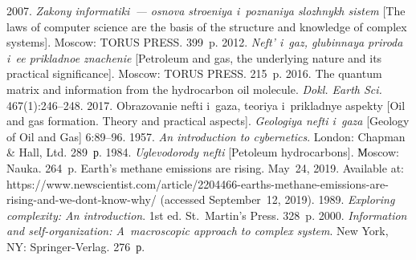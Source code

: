 


  



  \begin{multicols}{2}

\renewcommand{\bibname}{\protect\rmfamily References}

{\small\frenchspacing
 {%
 \begin{thebibliography}{99}
 2007. \textit{Zakony informatiki~--- osnova stroeniya i~poznaniya slozhnykh 
sistem} [The laws of computer science are the basis of the structure and knowledge of complex 
systems]. Moscow: TORUS PRESS. 399~p.
 2012. \textit{Neft' i~gaz, glubinnaya priroda i~ee 
prikladnoe 
znachenie} [Petroleum and gas, the underlying nature and its practical significance]. Moscow: 
TORUS PRESS. 215~p.
 2016. The 
quantum matrix and information from the hydrocarbon oil molecule. 
\textit{Dokl. Earth Sci.}  467(1):246--248.
 2017. Obrazovanie nefti i~gaza, teoriya i~prikladnye aspekty 
[Oil and gas formation. Theory and practical aspects]. \textit{Geologiya nefti i~gaza} [Geology 
of Oil and Gas] 6:89--96.
 1957. \textit{An introduction to cybernetics}. London: Chapman \& Hall, Ltd.  
289~р.
 1984. \textit{Uglevodorody nefti} [Petoleum hydrocarbons]. Мoscow: Nauka. 
264~p.
Earth's methane emissions are rising. May~24, 2019. Available at: {\sf 
 https://www.newscientist.com/article/2204466-earths-methane-emissions-are-rising-and-we-dont-know-why/} (accessed September~12, 2019).
 1989. \textit{Exploring 
complexity: An introduction}. 1st ed. St.\ Martin's Press. 328~p.
 2000. \textit{Information and self-organization: A~macroscopic approach to complex 
system}. New York, NY: Springer-Verlag. 276~р.

\end{thebibliography}}}
\end{multicols}
